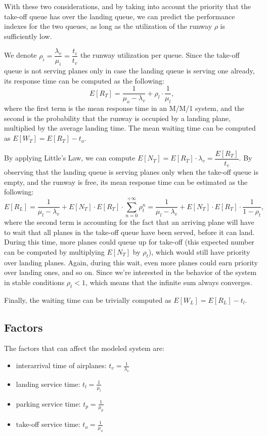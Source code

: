 \documentclass[12pt]{article}
\begin{document}
With these two considerations, and by taking into account the priority that the take-off queue has over the landing queue, we can predict the performance indexes for the two queues, as long as the utilization of the runway $\rho$ is sufficiently low.

We denote $\rho_i = \dfrac{\lambda_v}{\mu_i} = \dfrac{t_i}{t_v}$ the runway utilization per queue. Since the take-off queue is not serving planes only in case the landing queue is serving one already, its response time can be computed as the following:
\begin{equation}
    E[R_T] = \dfrac{1}{\mu_o - \lambda_v} + \rho_l \cdot \dfrac{1}{\mu_l} \text{,}
    \label{r-t}
\end{equation}
where the first term is the mean response time in an M/M/1 system, and the second is the probability that the runway is occupied by a landing plane, multiplied by the average landing time. The mean waiting time can be computed as $E[W_T] = E[R_T] - t_o$.

By applying Little's Law, we can compute $E[N_T] = E[R_T] \cdot \lambda_v = \dfrac{E[R_T]}{t_v}$. By observing that the landing queue is serving planes only when the take-off queue is empty, and the runway is free, its mean response time can be estimated as the following:
\begin{equation}
    E[R_L] = \dfrac{1}{\mu_l - \lambda_v} + E[N_T] \cdot E[R_T] \cdot \sum_{n=0}^{+\infty} \rho_t^n = \dfrac{1}{\mu_l - \lambda_v} + E[N_T] \cdot E[R_T] \cdot \dfrac{1}{1 - \rho_t} \text{,}
    \label{r-l}
\end{equation}
where the second term is accounting for the fact that an arriving plane will have to wait that all planes in the take-off queue have been served, before it can land. During this time, more planes could queue up for take-off (this expected number can be computed by multiplying $E[N_T]$ by $\rho_t$), which would still have priority over landing planes. Again, during this wait, even more planes could earn priority over landing ones, and so on. Since we're interested in the behavior of the system in stable conditions $\rho_t < 1$, which means that the infinite sum always converges.

Finally, the waiting time can be trivially computed as $E[W_L] = E[R_L] - t_l$.

\subsection{Factors}
The factors that can affect the modeled system are:
\begin{itemize}
    \item interarrival time of airplanes: $t_v = \tfrac{1}{\lambda_v}$
    \item landing service time: $t_l = \tfrac{1}{\mu_l}$
    \item parking service time: $t_p = \tfrac{1}{\mu_p}$
    \item take-off service time: $t_o = \tfrac{1}{\mu_o}$
\end{itemize}
\end{document}
